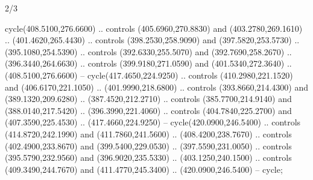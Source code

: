 \begin{flagdescription}{2/3}
\begin{scope}
\begin{scope}[xshift=0.5\flaglength,yshift=0.5\flagwidth,scale=\flagwidth/227.6]
\begin{scope}[xshift=-55mm,yshift=49mm,scale=0.5]
\begin{scope}[y=0.80pt, x=0.80pt, yscale=-1]
\begin{scope}[shift={(-56.86513,48.84569)},fill=red]
  cycle(408.5100,276.6600) .. controls (405.6960,270.8830) and
  (403.2780,269.1610) .. (401.4620,265.4430) .. controls (398.2530,258.9090) and
  (397.5820,253.5730) .. (395.1080,254.5390) .. controls (392.6330,255.5070) and
  (392.7690,258.2670) .. (396.3440,264.6630) .. controls (399.9180,271.0590) and
  (401.5340,272.3640) .. (408.5100,276.6600) -- cycle(417.4650,224.9250) ..
  controls (410.2980,221.1520) and (406.6170,221.1050) .. (401.9990,218.6800) ..
  controls (393.8660,214.4300) and (389.1320,209.6280) .. (387.4520,212.2710) ..
  controls (385.7700,214.9140) and (388.0140,217.5420) .. (396.3990,221.4060) ..
  controls (404.7840,225.2700) and (407.3590,225.4530) .. (417.4660,224.9250) --
  cycle(420.0900,246.5400) .. controls (414.8720,242.1990) and
  (411.7860,241.5600) .. (408.4200,238.7670) .. controls (402.4900,233.8670) and
  (399.5400,229.0530) .. (397.5590,231.0050) .. controls (395.5790,232.9560) and
  (396.9020,235.5330) .. (403.1250,240.1500) .. controls (409.3490,244.7670) and
  (411.4770,245.3400) .. (420.0900,246.5400) -- cycle;
\end{scope}
\end{scope}
\end{scope}
\end{scope}
\end{scope}
\fi
\framecode{}
\end{flagdescription}
